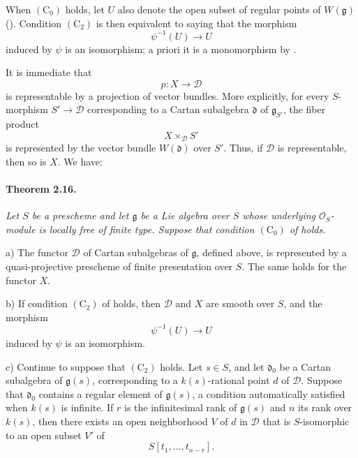 When \((\mathrm C_0)\) holds, let \(U\) also denote the open subset
of regular points of \(W(\mathfrak g)\) \textup{()}. Condition
\((\mathrm C_2)\) is then equivalent to saying that the morphism
\[
  \psi^{-1}(U)\longrightarrow U
\]
induced by \(\psi\) is an isomorphism; a priori it is a
monomorphism by .

It is immediate that
\[
  p\colon X\longrightarrow\mathcal D
\]
is representable by a projection of vector bundles. More
explicitly, for every \(S\)-morphism \(S'\to\mathcal D\)
corresponding to a Cartan subalgebra \(\mathfrak d\) of
\(\mathfrak g_{S'}\), the fiber product
\[
  X\times_{\mathcal D}S'
\]
is represented by the vector bundle \(W(\mathfrak d)\) over
\(S'\). Thus, if \(\mathcal D\) is representable, then so is \(X\).
We have:

\paragraph{\textbf{Theorem 2.16.}}
{\itshape Let \(S\) be a prescheme and let \(\mathfrak g\) be a Lie
algebra over \(S\) whose underlying \(\mathcal O_S\)-module is
locally free of finite type. Suppose that condition
\((\mathrm C_0)\) of  holds.

\smallskip
\noindent
\textup{a)}
The functor \(\mathcal D\) of Cartan subalgebras of
\(\mathfrak g\), defined above, is represented by a
quasi-projective prescheme of finite presentation over \(S\).
The same holds for the functor \(X\).

\smallskip
\noindent
\textup{b)}
If condition \((\mathrm C_2)\) of  holds, then
\(\mathcal D\) and \(X\) are smooth over \(S\), and the morphism
\[
  \psi^{-1}(U)\longrightarrow U
\]
induced by \(\psi\) is an isomorphism.

\smallskip
\noindent
\textup{c)}
Continue to suppose that \((\mathrm C_2)\) holds. Let \(s\in S\),
and let \(\mathfrak d_0\) be a Cartan subalgebra of
\(\mathfrak g(s)\), corresponding to a \(k(s)\)-rational point
\(d\) of \(\mathcal D\). Suppose that \(\mathfrak d_0\) contains a
regular element of \(\mathfrak g(s)\), a condition automatically
satisfied when \(k(s)\) is infinite. If \(r\) is the infinitesimal
rank of \(\mathfrak g(s)\) and \(n\) its rank over \(k(s)\), then
there exists an open neighborhood \(V\) of \(d\) in
\(\mathcal D\) that is \(S\)-isomorphic to an open subset \(V'\)
of
\[
  S[t_1,\ldots,t_{n-r}].
\]}

